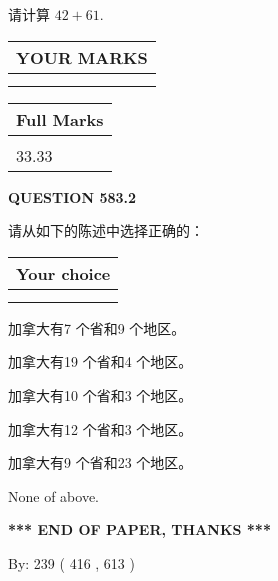 \documentclass{ctexart}
\begin{document}
  
 
请计算 $ %
42 +  %
61 $.
 

 

 
  
\vspace{0.2in}
  
\noindent\begin{tabular}{|l|}
\hline
 YOUR MARKS  \\
\hline
 \\ 
 \\ 
\hline
\end{tabular}
\hspace{0.05in} \begin{tabular}{|l|}
\hline
 Full Marks  \\
\hline
 \\ 
33.33 \\
\hline
\end{tabular}
{\textbf{\Large{QUESTION
583.2 
}}}
  
  
请从如下的陈述中选择正确的：
  
  
\noindent\hspace{3.0in} \begin{tabular}{|l|}
\hline
Your choice \\
\hline
 \\ 
 \\ 
\hline
\end{tabular}
  
  
 
 
加拿大有7 个省和9 个地区。
 
 
加拿大有19 个省和4 个地区。
 
 
加拿大有10 个省和3 个地区。
 
 
加拿大有12 个省和3 个地区。
 
 
加拿大有9 个省和23 个地区。
 
 
 None of above.
 
 
   
   
 \vspace{0.2in}
 
   
   
   
   
\vspace{1.0in} 
{\textbf{\large{ *** END OF PAPER, THANKS *** }}} 
   
   
\hspace{1.0in} By: 
 239 ( 416 ,  613 )
   
\end{document}
